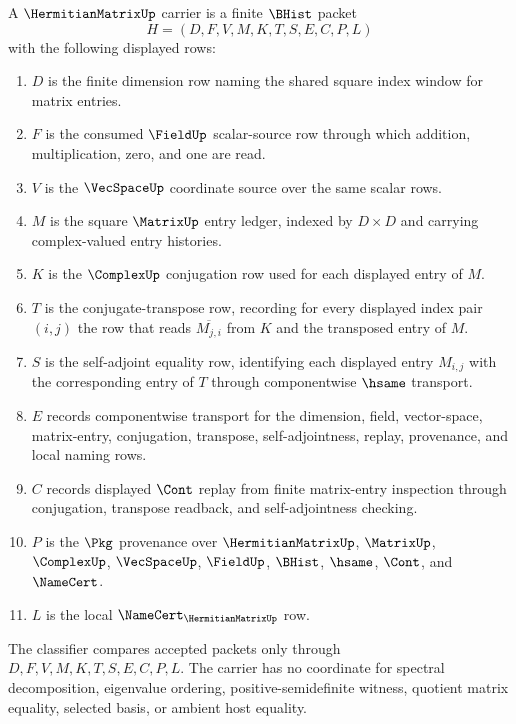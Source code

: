 \begin{definition}
\label{def:hermitian-matrix-carrier}
A $\HermitianMatrixUp$ carrier is a finite $\BHist$ packet
$$
H=(D,F,V,M,K,T,S,E,C,P,L)
$$
with the following displayed rows:
\begin{enumerate}
\item $D$ is the finite dimension row naming the shared square index window for matrix entries.
\item $F$ is the consumed $\FieldUp$ scalar-source row through which addition, multiplication, zero, and one are read.
\item $V$ is the $\VecSpaceUp$ coordinate source over the same scalar rows.
\item $M$ is the square $\MatrixUp$ entry ledger, indexed by $D \times D$ and carrying complex-valued entry histories.
\item $K$ is the $\ComplexUp$ conjugation row used for each displayed entry of $M$.
\item $T$ is the conjugate-transpose row, recording for every displayed index pair $(i,j)$ the row that reads $\overline{M_{j,i}}$ from $K$ and the transposed entry of $M$.
\item $S$ is the self-adjoint equality row, identifying each displayed entry $M_{i,j}$ with the corresponding entry of $T$ through componentwise $\hsame$ transport.
\item $E$ records componentwise transport for the dimension, field, vector-space, matrix-entry, conjugation, transpose, self-adjointness, replay, provenance, and local naming rows.
\item $C$ records displayed $\Cont$ replay from finite matrix-entry inspection through conjugation, transpose readback, and self-adjointness checking.
\item $P$ is the $\Pkg$ provenance over $\HermitianMatrixUp$, $\MatrixUp$, $\ComplexUp$, $\VecSpaceUp$, $\FieldUp$, $\BHist$, $\hsame$, $\Cont$, and $\NameCert$.
\item $L$ is the local $\NameCert_{\HermitianMatrixUp}$ row.
\end{enumerate}
The classifier compares accepted packets only through $D,F,V,M,K,T,S,E,C,P,L$. The carrier has no coordinate for spectral decomposition, eigenvalue ordering, positive-semidefinite witness, quotient matrix equality, selected basis, or ambient host equality.
\end{definition}

